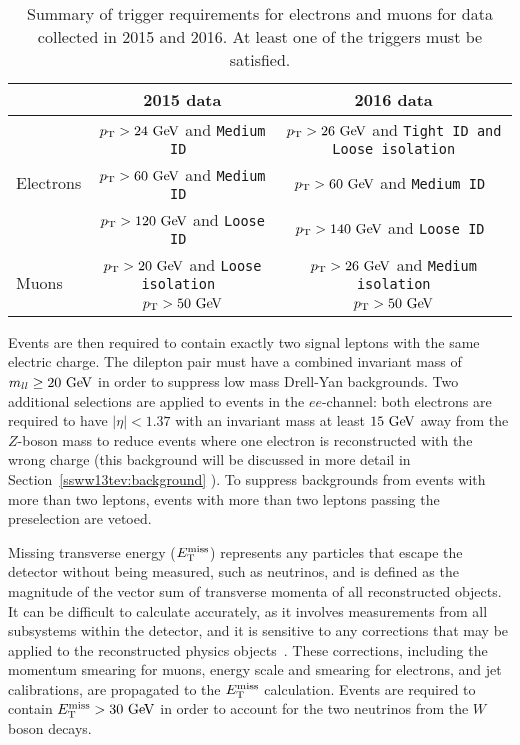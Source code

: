 \begin{table}[htbp]
  \centering
  \begin{tabular}{l | c | c}
    & 2015 data & 2016 data \\
    \hline\hline
    \multirow{3}{*}{Electrons} & $\pt > 24\gev$ and \tt{Medium} ID & $\pt > 26\gev$ and \tt{Tight} ID and \tt{Loose} isolation\\
                               & $\pt > 60\gev$ and \tt{Medium} ID & $\pt > 60\gev$ and \tt{Medium} ID \\
                               & $\pt > 120\gev$ and \tt{Loose} ID & $\pt > 140\gev$ and \tt{Loose} ID \\
    \hline
    \multirow{2}{*}{Muons}     & $\pt > 20\gev$ and \tt{Loose} isolation & $\pt > 26\gev$ and \tt{Medium} isolation\\
                               & $\pt > 50\gev$ & $\pt > 50\gev$ \\
    \hline
  \end{tabular}
  \caption{Summary of trigger requirements for electrons and muons for  data collected in 2015 and 2016.  At least one of the triggers must be satisfied.}
  \label{tab:ssww13tev_triggers}
\end{table}

Events are then required to contain exactly two signal leptons with the same electric charge.
The dilepton pair must have a combined invariant mass of $m_{ll} \ge 20\gev$ in order to suppress low mass Drell-Yan backgrounds.
Two additional selections are applied to events in the $ee$-channel: both electrons are required to have $|\eta| < 1.37$ with an invariant mass at least $15\gev$ away from the $Z$-boson mass to reduce events where one electron is reconstructed with the wrong charge (this background will be discussed in more detail in Section~\ref{ssww13tev:background} ). 
To suppress backgrounds from events with more than two leptons, events with more than two leptons passing the preselection are vetoed.

Missing transverse energy ($E_{\mathrm{T}}^{\mathrm{miss}}$) represents any particles that escape the detector without being measured, such as neutrinos, and is defined as the magnitude of the vector sum of transverse momenta of all reconstructed objects.
It can be difficult to calculate accurately, as it involves measurements from all subsystems within the detector, and it is sensitive to any corrections that may be applied to the reconstructed physics objects~\cite{2018.met-13tev}.
These corrections, including the momentum smearing for muons, energy scale and smearing for electrons, and jet calibrations, are propagated to the $E_{\mathrm{T}}^{\mathrm{miss}}$ calculation.
Events are required to contain $\met > 30\gev$ in order to account for the two neutrinos from the $W$ boson decays.

